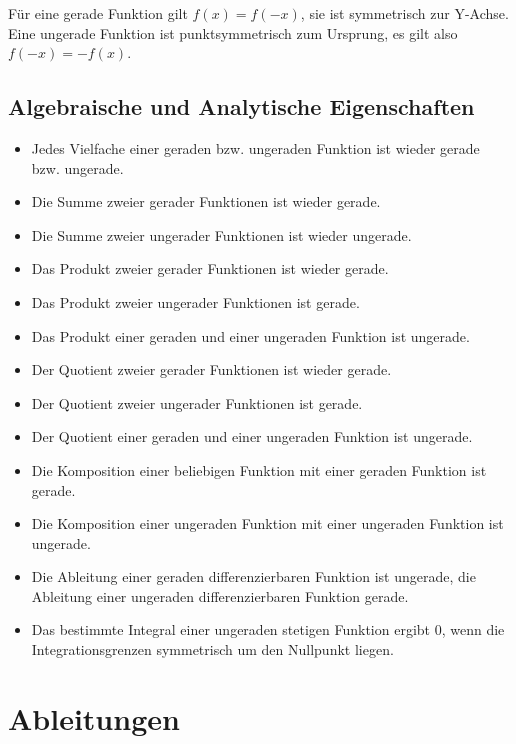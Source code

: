 \documentclass[a4paper,fontsize = 7pt]{scrartcl}
\begin{document}
Für eine gerade Funktion gilt $f(x)=f(-x)$, sie ist symmetrisch zur Y-Achse.\\
Eine ungerade Funktion ist punktsymmetrisch zum Ursprung, es gilt also $f(-x)=-f(x)$.

\subsection{Algebraische und Analytische Eigenschaften}%


\begin{itemize}
	\item Jedes Vielfache einer geraden bzw. ungeraden Funktion ist wieder gerade bzw. ungerade.
	\item Die Summe zweier gerader Funktionen ist wieder gerade.
	\item Die Summe zweier ungerader Funktionen ist wieder ungerade.
	\item Das Produkt zweier gerader Funktionen ist wieder gerade.
	\item Das Produkt zweier ungerader Funktionen ist gerade.
	\item Das Produkt einer geraden und einer ungeraden Funktion ist ungerade.
	\item Der Quotient zweier gerader Funktionen ist wieder gerade.
	\item Der Quotient zweier ungerader Funktionen ist gerade.
	\item Der Quotient einer geraden und einer ungeraden Funktion ist ungerade.
	\item Die Komposition einer beliebigen Funktion mit einer geraden Funktion ist gerade.
	\item Die Komposition einer ungeraden Funktion mit einer ungeraden Funktion ist ungerade.
	\item Die Ableitung einer geraden differenzierbaren Funktion ist ungerade, die Ableitung einer ungeraden differenzierbaren Funktion gerade. 
	\item Das bestimmte Integral einer ungeraden stetigen Funktion ergibt $0$, wenn die Integrationsgrenzen symmetrisch um den Nullpunkt liegen.
\end{itemize}


\section{Ableitungen}
\end{document}
